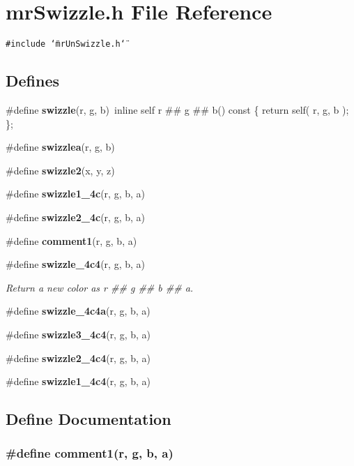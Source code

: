 \section{mr\-Swizzle.h File Reference}
\label{mrSwizzle_8h}
{\tt \#include \char`\"{}mr\-Un\-Swizzle.h\char`\"{}}\par
\subsection*{Defines}
\begin{CompactItemize}
\item 
\#define {\bf swizzle}(r, g, b)\ inline self  r \#\# g \#\# b()  const \{ return self( r, g, b ); \};
\item 
\#define {\bf swizzlea}(r, g, b)
\item 
\#define {\bf swizzle2}(x, y, z)
\item 
\#define {\bf swizzle1\_\-4c}(r, g, b, a)
\item 
\#define {\bf swizzle2\_\-4c}(r, g, b, a)
\item 
\#define {\bf comment1}(r, g, b, a)
\item 
\#define {\bf swizzle\_\-4c4}(r, g, b, a)
\begin{CompactList}\small\item\em Return a new color as r \#\# g \#\# b \#\# a. \item\end{CompactList}\item 
\#define {\bf swizzle\_\-4c4a}(r, g, b, a)
\item 
\#define {\bf swizzle3\_\-4c4}(r, g, b, a)
\item 
\#define {\bf swizzle2\_\-4c4}(r, g, b, a)
\item 
\#define {\bf swizzle1\_\-4c4}(r, g, b, a)
\end{CompactItemize}


\subsection{Define Documentation}
\subsubsection{\setlength{\rightskip}{0pt plus 5cm}\#define comment1(r, g, b, a)}\label{mrSwizzle_8h_a5}


